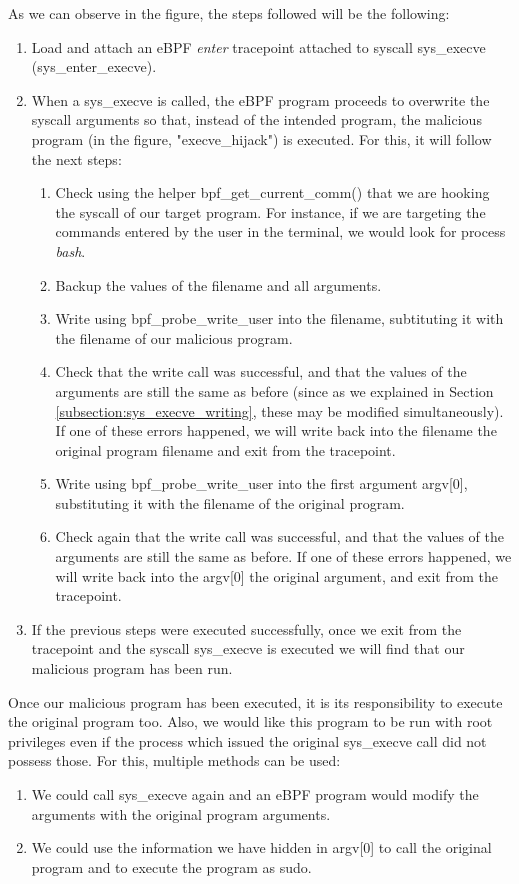 As we can observe in the figure, the steps followed will be the following:
\begin{enumerate}
\item Load and attach an eBPF \textit{enter} tracepoint attached to syscall sys\_execve (sys\_enter\_execve). 
\item When a sys\_execve is called, the eBPF program proceeds to overwrite the syscall arguments so that, instead of the intended program, the malicious program (in the figure, "execve\_hijack") is executed. For this, it will follow the next steps:

\begin{enumerate}
	\item Check using the helper bpf\_get\_current\_comm() that we are hooking the syscall of our target program. For instance, if we are targeting the commands entered by the user in the terminal, we would look for process \textit{bash}.
	\item Backup the values of the filename and all arguments.
	\item Write using bpf\_probe\_write\_user into the filename, subtituting it with the filename of our malicious program.
	\item Check that the write call was successful, and that the values of the arguments are still the same as before (since as we explained in Section \ref{subsection:sys_execve_writing}, these may be modified simultaneously). If one of these errors happened, we will write back into the filename the original program filename and exit from the tracepoint.
	\item Write using bpf\_probe\_write\_user into the first argument argv[0], substituting it with the filename of the original program.
	\item Check again that the write call was successful, and that the values of the arguments are still the same as before. If one of these errors happened, we will write back into the argv[0] the original argument, and exit from the tracepoint.
\end{enumerate}
\item If the previous steps were executed successfully, once we exit from the tracepoint and the syscall sys\_execve is executed we will find that our malicious program has been run.
\end{enumerate}

Once our malicious program has been executed, it is its responsibility to execute the original program too. Also, we would like this program to be run with root privileges even if the process which issued the original sys\_execve call did not possess those. For this, multiple methods can be used:
\begin{enumerate}
\item We could call sys\_execve again and an eBPF program would modify the arguments with the original program arguments.
\item We could use the information we have hidden in argv[0] to call the original program and to execute the program as sudo.
\end{enumerate}

